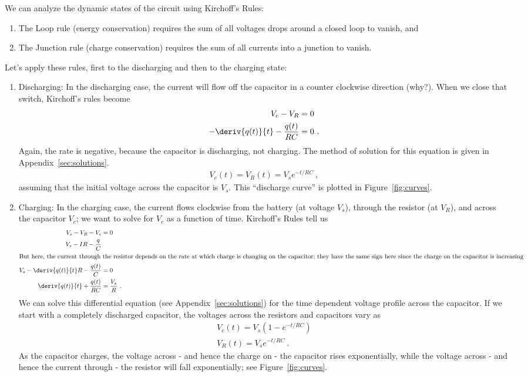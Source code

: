 \documentclass[12pt]{article}
\begin{document}
We can analyze the dynamic states of the circuit using Kirchoff's
Rules:
\begin{enumerate}
\item The Loop rule (energy conservation) requires the sum of all
  voltages drops around a closed loop to vanish, and
\item The Junction rule (charge conservation) requires the sum of all
  currents into a junction to vanish.
\end{enumerate}
Let's apply these rules, first to the discharging and then to the
charging state:
\begin{enumerate}
\item Discharging: In the discharging case, the current will flow off
  the capacitor in a counter clockwise direction (why?).  When we
  close that switch, Kirchoff's rules become 
  \begin{align*}
    V_c - V_R &= 0\\
    -\deriv{q(t)}{t} - \frac{q(t)}{RC} &= 0\ .
  \end{align*}
  Again, the rate is negative, because the capacitor is discharging,
  not charging.  The method of solution for this equation is given in
  Appendix~\ref{sec:solutions}.
  \begin{gather*}
    V_c(t) = V_R(t) = V_s e^{-t/RC}\ ,
  \end{gather*}
  assuming that the initial voltage across the capacitor is $V_s$.
  This ``discharge curve'' is plotted in Figure~\ref{fig:curves}.
\item Charging: In the charging case, the current flows clockwise from
  the battery (at voltage $V_s$), through the resistor (at $V_R$), and
  across the capacitor $V_c$; we want to solve for $V_c$ as a function
  of time.  Kirchoff's Rules tell us
  \begin{align*}
    V_s - V_R - V_c &= 0\\
    V_s - I R - \frac{q}{C}\\
    \intertext{But here, the current through the resistor depends on
      the rate at which charge is changing on the capacitor; they have
      the same sign here since the charge on the capacitor is
      increasing}
    V_s - \deriv{q(t)}{t} R - \frac{q(t)}{C} &=0\\
    \deriv{q(t)}{t} + \frac{q(t)}{RC} &= \frac{V_s}{R}\ .
  \end{align*}
  We can solve this differential equation (see
  Appendix~\ref{sec:solutions}) for the time dependent voltage profile
  across the capacitor.  If we start with a completely discharged
  capacitor, the voltages across the resistors and capacitors vary as
  \begin{gather*}
    V_c(t) = V_s \left( 1 - e^{-t/RC} \right)\\
    V_R(t) = V_s e^{-t/RC}\ .
  \end{gather*}
  As the capacitor charges, the voltage across - and hence the
  charge on - the capacitor rises exponentially, while the voltage
  across - and hence the current through - the resistor will fall
  exponentially; see Figure~\ref{fig:curves}.
\end{enumerate}
\end{document}
